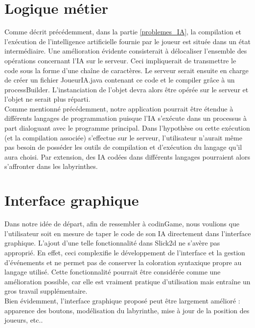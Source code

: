 \section{Logique métier}
	
	Comme décrit précédemment, dans la partie \ref{problemes_IA}, la compilation et l'exécution de l'intelligence artificielle fournie par le joueur est située dans un état intermédiaire. Une amélioration évidente consisterait à délocaliser l'ensemble des opérations concernant l'IA sur le serveur. Ceci impliquerait de transmettre le code sous la forme d'une chaîne de caractères. Le serveur serait ensuite en charge de créer un fichier JoueurIA.java contenant ce code et le compiler grâce à un processBuilder. L'instanciation de l'objet devra alors être opérée sur le serveur et l'objet ne serait plus réparti. \\
	
	Comme mentionné précédemment, notre application pourrait être étendue à différents langages de programmation puisque l'IA s'exécute dans un processus à part dialoguant avec le programme principal. Dans l'hypothèse ou cette exécution (et la compilation associée) s'effectue sur le serveur, l'utilisateur n'aurait même pas besoin de posséder les outils de compilation et d'exécution du langage qu'il aura choisi. Par extension, des IA codées dans différents langages pourraient alors s'affronter dans les labyrinthes.

\section{Interface graphique}

Dans notre idée de départ, afin de ressembler à codinGame, nous voulions que l'utilisateur soit en mesure de taper le code de son IA directement dans l'interface graphique. L'ajout d'une telle fonctionnalité dans Slick2d ne s'avère pas approprié. En effet, ceci complexifie le développement de l'interface et la gestion d'événements et ne permet pas de conserver la coloration syntaxique propre au langage utilisé. Cette fonctionnalité pourrait être considérée comme une amélioration possible, car elle est vraiment pratique d'utilisation mais entraîne un gros travail supplémentaire.\\

Bien évidemment, l'interface graphique proposé peut être largement amélioré : apparence des boutons, modélisation du labyrinthe, mise à jour de la position des joueurs, etc..